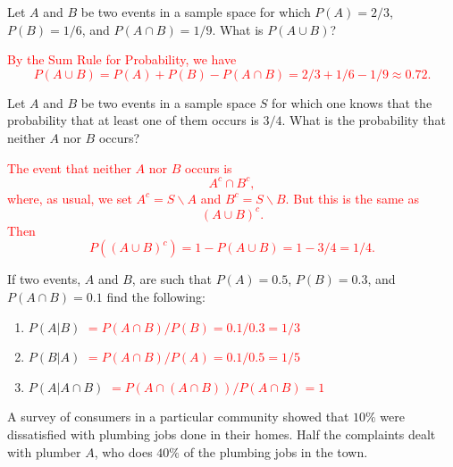 \documentclass[12pt,reqno]{amsart}
\begin{document}
\bigskip
\prob Let $A$ and $B$ be two events in a sample space for which $P(A) = 2/3$, $P(B) = 1/6$, and $P(A \cap B) = 1/9$. What is $P(A \cup B)$?


\bigskip
\textcolor{red}{By the Sum Rule for Probability, we have
	\[
	P(A\cup B) = P(A) + P(B) - P(A\cap B) = 2/3 + 1/6 - 1/9 \approx 0.72.
	\]}















\bigskip
\prob Let $A$ and $B$ be two events in a sample space $S$ for which one knows that the probability that at least one of them occurs is $3/4$. What is the probability that neither $A$ nor $B$ occurs?

\bigskip
\textcolor{red}{The event that neither $A$ nor $B$ occurs is
	\[
	A^c \cap B^c,
	\]
where, as usual, we set $A^c = S\smallsetminus A$ and $B^c = S\smallsetminus B$. But this is the same as
	\[
	(A\cup B)^c.
	\]
Then
	\[
	P((A\cup B)^c) = 1 - P(A\cup B) = 1 - 3/4 = 1/4.
	\]}










\bigskip
\prob If two events, $A$ and $B$, are such that $P(A)=0.5$, $P(B)=0.3$, and $P(A\cap B)=0.1$ find the following:

\medskip
\begin{enumerate}
\item $P(A|B)$ \textcolor{red}{$=P(A\cap B)/P(B) = 0.1/0.3 = 1/3$}
\item $P(B|A)$ \textcolor{red}{$=P(A\cap B)/P(A) = 0.1/0.5 = 1/5$}
\item $P(A |A\cap B)$ \textcolor{red}{$=P(A\cap (A\cap B))/P(A\cap B) = 1$}
\end{enumerate}









\bigskip
\prob A survey of consumers in a particular community showed that $10\%$ were dissatisfied with plumbing jobs done in their homes. Half the complaints dealt with plumber $A$, who does $40\%$ of the plumbing jobs in the town.
\end{document}
